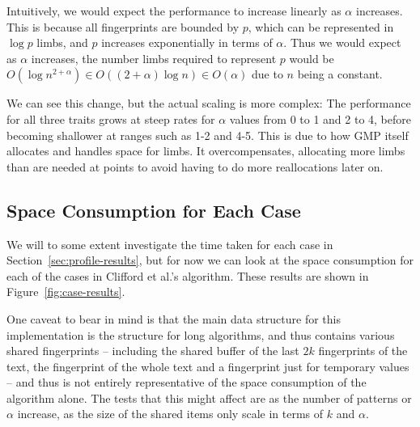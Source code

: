\documentclass[ %
                    author={Dominic Joseph Moylett},
                    degree={MEng},
                     title={Dictionary Matching with Fingerprints},
                  subtitle={An Empirical Analysis},
                      type={research},
                      year={2015} ]{dissertation}
\begin{document}
Intuitively, we would expect the performance to increase linearly as $\alpha$ increases. This is because all fingerprints are bounded by $p$, which can be represented in $\log p$ limbs, and $p$ increases exponentially in terms of $\alpha$. Thus we would expect as $\alpha$ increases, the number limbs required to represent $p$ would be $O(\log n^{2 + \alpha}) \in O((2 + \alpha)\log n) \in O(\alpha)$ due to $n$ being a constant.

We can see this change, but the actual scaling is more complex: The performance for all three traits grows at steep rates for $\alpha$ values from 0 to 1 and 2 to 4, before becoming shallower at ranges such as 1-2 and 4-5. This is due to how GMP itself allocates and handles space for limbs. It overcompensates, allocating more limbs than are needed at points to avoid having to do more reallocations later on.

\subsection{Space Consumption for Each Case}
\label{ssec:case-size}

We will to some extent investigate the time taken for each case in Section~\ref{sec:profile-results}, but for now we can look at the space consumption for each of the cases in Clifford et al.'s algorithm. These results are shown in Figure~\ref{fig:case-results}.

One caveat to bear in mind is that the main data structure for this implementation is the structure for long algorithms, and thus contains various shared fingerprints -- including the shared buffer of the last $2k$ fingerprints of the text, the fingerprint of the whole text and a fingerprint just for temporary values -- and thus is not entirely representative of the space consumption of the algorithm alone. The tests that this might affect are as the number of patterns or $\alpha$ increase, as the size of the shared items only scale in terms of $k$ and $\alpha$.
\end{document}
